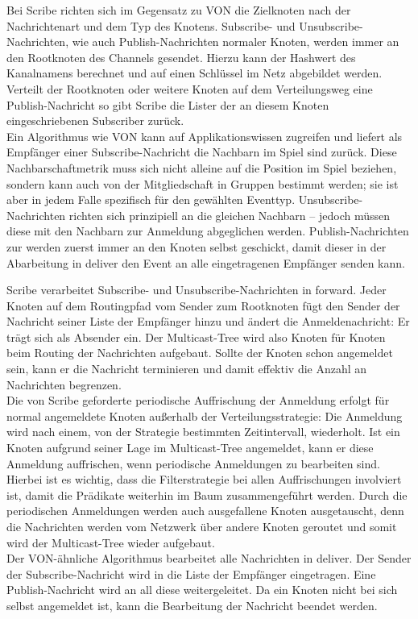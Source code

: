 Bei Scribe richten sich im Gegensatz zu VON die Zielknoten nach der Nachrichtenart und dem Typ des Knotens. Subscribe- und Unsubscribe-Nachrichten, wie auch Publish-Nachrichten normaler Knoten, werden immer an den Rootknoten des Channels gesendet. Hierzu kann der Hashwert des Kanalnamens berechnet und auf einen Schlüssel im Netz abgebildet werden. Verteilt der Rootknoten oder weitere Knoten auf dem Verteilungsweg eine Publish-Nachricht so gibt Scribe die Lister der an diesem Knoten eingeschriebenen Subscriber zurück.\\
Ein Algorithmus wie VON kann auf Applikationswissen zugreifen und liefert als Empfänger einer Subscribe-Nachricht die Nachbarn im Spiel sind zurück. Diese Nachbarschaftmetrik muss sich nicht alleine auf die Position im Spiel beziehen, sondern kann auch von der Mitgliedschaft in Gruppen bestimmt werden; sie ist aber in jedem Falle spezifisch für den gewählten Eventtyp. Unsubscribe-Nachrichten richten sich prinzipiell an die gleichen Nachbarn -- jedoch müssen diese mit den Nachbarn zur Anmeldung abgeglichen werden. Publish-Nachrichten zur werden zuerst immer an den Knoten selbst geschickt, damit dieser in der Abarbeitung in deliver den Event an alle eingetragenen Empfänger senden kann.

Scribe verarbeitet Subscribe- und Unsubscribe-Nachrichten in forward. Jeder Knoten auf dem Routingpfad vom Sender zum Rootknoten fügt den Sender der Nachricht seiner Liste der Empfänger hinzu und ändert die Anmeldenachricht: Er trägt sich als Absender ein. Der Multicast-Tree wird also Knoten für Knoten beim Routing der Nachrichten aufgebaut. Sollte der Knoten schon angemeldet sein, kann er die Nachricht terminieren und damit effektiv die Anzahl an Nachrichten begrenzen.\\
Die von Scribe geforderte periodische Auffrischung der Anmeldung erfolgt für normal angemeldete Knoten außerhalb der Verteilungsstrategie: Die Anmeldung wird nach einem, von der Strategie bestimmten Zeitintervall, wiederholt. Ist ein Knoten aufgrund seiner Lage im Multicast-Tree angemeldet, kann er diese Anmeldung auffrischen, wenn periodische Anmeldungen zu bearbeiten sind. Hierbei ist es wichtig, dass die Filterstrategie bei allen Auffrischungen involviert ist, damit die Prädikate weiterhin im Baum zusammengeführt werden. Durch die periodischen Anmeldungen werden auch ausgefallene Knoten ausgetauscht, denn die Nachrichten werden vom Netzwerk über andere Knoten geroutet und somit wird der Multicast-Tree wieder aufgebaut.\\
Der VON-ähnliche Algorithmus bearbeitet alle Nachrichten in deliver. Der Sender der Subscribe-Nachricht wird in die Liste der Empfänger eingetragen. Eine Publish-Nachricht wird an all diese weitergeleitet. Da ein Knoten nicht bei sich selbst angemeldet ist, kann die Bearbeitung der Nachricht beendet werden.

